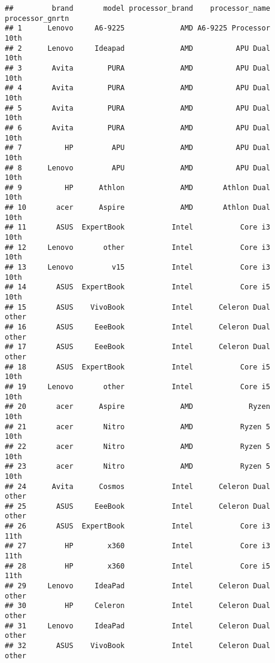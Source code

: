 \documentclass[
]{article}
\begin{document}
\begin{verbatim}
##         brand       model processor_brand    processor_name processor_gnrtn
## 1      Lenovo     A6-9225             AMD A6-9225 Processor            10th
## 2      Lenovo     Ideapad             AMD          APU Dual            10th
## 3       Avita        PURA             AMD          APU Dual            10th
## 4       Avita        PURA             AMD          APU Dual            10th
## 5       Avita        PURA             AMD          APU Dual            10th
## 6       Avita        PURA             AMD          APU Dual            10th
## 7          HP         APU             AMD          APU Dual            10th
## 8      Lenovo         APU             AMD          APU Dual            10th
## 9          HP      Athlon             AMD       Athlon Dual            10th
## 10       acer      Aspire             AMD       Athlon Dual            10th
## 11       ASUS  ExpertBook           Intel           Core i3            10th
## 12     Lenovo       other           Intel           Core i3            10th
## 13     Lenovo         v15           Intel           Core i3            10th
## 14       ASUS  ExpertBook           Intel           Core i5            10th
## 15       ASUS    VivoBook           Intel      Celeron Dual           other
## 16       ASUS     EeeBook           Intel      Celeron Dual           other
## 17       ASUS     EeeBook           Intel      Celeron Dual           other
## 18       ASUS  ExpertBook           Intel           Core i5            10th
## 19     Lenovo       other           Intel           Core i5            10th
## 20       acer      Aspire             AMD             Ryzen            10th
## 21       acer       Nitro             AMD           Ryzen 5            10th
## 22       acer       Nitro             AMD           Ryzen 5            10th
## 23       acer       Nitro             AMD           Ryzen 5            10th
## 24      Avita      Cosmos           Intel      Celeron Dual           other
## 25       ASUS     EeeBook           Intel      Celeron Dual           other
## 26       ASUS  ExpertBook           Intel           Core i3            11th
## 27         HP        x360           Intel           Core i3            11th
## 28         HP        x360           Intel           Core i5            11th
## 29     Lenovo     IdeaPad           Intel      Celeron Dual           other
## 30         HP     Celeron           Intel      Celeron Dual           other
## 31     Lenovo     IdeaPad           Intel      Celeron Dual           other
## 32       ASUS    VivoBook           Intel      Celeron Dual           other

\end{verbatim}
\end{document}
